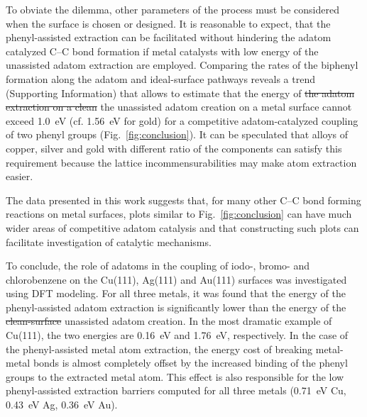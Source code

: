 \documentclass[aps,prb,amsmath,amssymb,11pt]{revtex4-1}
\newcommand{\sinfo}{Supporting Information}
\newcommand{\zhzh}{\color{blue}}
\begin{document}
To obviate the dilemma, other parameters of the process must be considered when the surface is chosen or designed. It is reasonable to expect, that the phenyl-assisted extraction can be facilitated without hindering the adatom catalyzed C--C bond formation if metal catalysts with low energy of the unassisted adatom extraction are employed. 
%
Comparing the rates of the biphenyl formation along the adatom and ideal-surface pathways reveals a trend (\sinfo) that allows to estimate that the energy of \sout{the adatom extraction on a clean} {\zhzh the unassisted adatom creation on a} metal surface cannot exceed \SI{1.0}{\electronvolt} (cf. \SI{1.56}{\electronvolt} for gold) for a competitive adatom-catalyzed coupling of two phenyl groups (Fig.~\ref{fig:conclusion}).
It can be speculated that alloys of copper, silver and gold with different ratio of the components can satisfy this requirement because the lattice incommensurabilities may make atom extraction easier. 


The data presented in this work suggests that, for many other C--C bond forming reactions on metal surfaces, plots similar to Fig.~\ref{fig:conclusion} can have much wider areas of competitive adatom catalysis and that constructing such plots can facilitate investigation of catalytic mechanisms. 


To conclude, the role of adatoms in the coupling of iodo-, bromo- and chlorobenzene on the Cu(111), Ag(111) and Au(111) surfaces was investigated using DFT modeling. For all three metals, it was found that the energy of the phenyl-assisted adatom extraction is significantly lower than the energy of the \sout{clean-surface} unassisted adatom creation. In the most dramatic example of Cu(111), the two energies are \SI{0.16}{\electronvolt} and \SI{1.76}{\electronvolt}, respectively. In the case of the phenyl-assisted metal atom extraction, the energy cost of breaking metal-metal bonds is almost completely offset by the increased binding of the phenyl groups to the extracted metal atom. This effect is also responsible for the low phenyl-assisted extraction barriers computed for all three metals (\SI{0.71}{\electronvolt} Cu, \SI{0.43}{\electronvolt} Ag, \SI{0.36}{\electronvolt} Au). 
\end{document}

